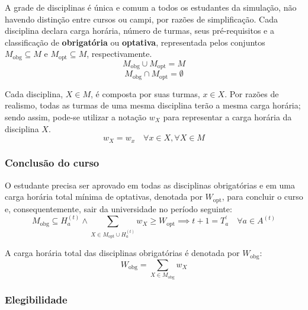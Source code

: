 \documentclass[
    12pt,
    openany,
    oneside,
    a4paper,
    english,
    brazil
]{abntex2}
\begin{document}
A grade de disciplinas é única e comum a todos os estudantes da simulação, não havendo distinção entre cursos ou campi, por razões de simplificação. Cada disciplina declara carga horária, número de turmas, seus pré-requisitos e a classificação de \textbf{obrigatória} ou \textbf{optativa}, representada pelos conjuntos $M_\text{obg} \subseteq M$ e $M_\text{opt} \subseteq M$, respectivamente. 
\begin{equation}
M_\text{obg} \cup M_\text{opt} = M
\end{equation}
\begin{equation}
M_\text{obg} \cap M_\text{opt} = \emptyset
\end{equation}

Cada disciplina, $X \in M$, é composta por suas turmas, $x \in X$. Por razões de realismo, todas as turmas de uma mesma disciplina terão a mesma carga horária; sendo assim, pode-se utilizar a notação $w_X$ para representar a carga horária da disciplina $X$.
\begin{equation}
    w_X = w_x \quad \forall x \in X, \forall X \in M
\end{equation}


\subsubsection{Conclusão do curso}

O estudante precisa ser aprovado em todas as disciplinas obrigatórias e em uma carga horária total mínima de optativas, denotada por $W_\text{opt}$, para concluir o curso e, consequentemente, sair da universidade no período seguinte:
\begin{equation} \label{eq:conclusao}
M_\text{obg} \subseteq H_a^{(t)} 
\land \sum_{X \in M_\text{opt} \cup H_a^{(t)}} w_{X} \geq W_\text{opt} 
\implies t + 1 = T^{\prime}_a
\quad \forall a \in A^{(t)}
\end{equation}

A carga horária total das disciplinas obrigatórias é denotada por $W_\text{obg}$:
\begin{equation}
W_\text{obg} = \sum_{X \in M_\text{obg}} w_X
\end{equation}

\subsubsection{Elegibilidade}
\end{document}
